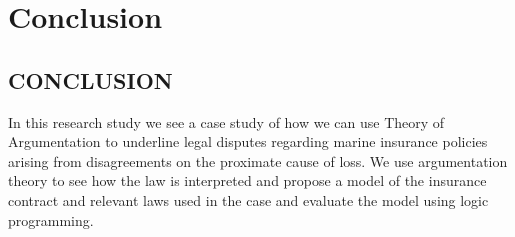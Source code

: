 \setlength{\footskip}{8mm}

\chapter{Conclusion}
\label{ch:conclusion}

\section{CONCLUSION}

In this research study we see a case study of how we can use Theory of Argumentation to underline legal disputes regarding marine insurance policies arising from disagreements on the proximate cause of loss.  We use argumentation theory to see how the law is interpreted and propose a model of the insurance contract and relevant laws used in the case and evaluate the model using logic programming. 


\FloatBarrier


